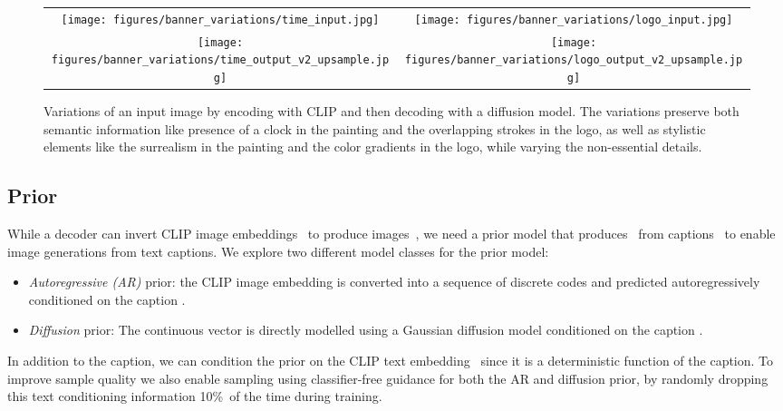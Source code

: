 \documentclass{article}
\begin{document}
\begin{figure*}[t!]
    \centering
    \setlength{\tabcolsep}{2.0pt}
    \begin{tabular}{cc}
        \texttt{[image: figures/banner\_variations/time\_input.jpg]} & 
        \texttt{[image: figures/banner\_variations/logo\_input.jpg]} 
        \rule{0pt}{0.0pt} \\
        \texttt{[image: figures/banner\_variations/time\_output\_v2\_upsample.jpg]} &
        \texttt{[image: figures/banner\_variations/logo\_output\_v2\_upsample.jpg]} 
        \rule{0pt}{0.5pt}
    \end{tabular}

    \caption{Variations of an input image by encoding with CLIP and then decoding with a diffusion model. The variations preserve both semantic information like presence of a clock in the painting and the overlapping strokes in the logo, as well as stylistic elements like the surrealism in the painting and the color gradients in the logo, while varying the non-essential details.}
    \label{fig:variations_examples}
    \vskip -0.1in 
\end{figure*}

\subsection{Prior}
While a decoder can invert CLIP image embeddings~ to produce images~, we need a prior model that produces~ from captions~ to enable image generations from text captions. We explore two different model classes for the prior model:

\begin{itemize}
    \item \textit{Autoregressive (AR)} prior: the CLIP image embedding  is converted into a sequence of discrete codes and predicted autoregressively conditioned on the caption .
    \item \textit{Diffusion} prior: The continuous vector  is directly modelled using a Gaussian diffusion model conditioned on the caption .
\end{itemize}

In addition to the caption, we can condition the prior on the CLIP text embedding~ since it is a deterministic function of the caption. To improve sample quality we also enable sampling using classifier-free guidance for both the AR and diffusion prior, by randomly dropping this text conditioning information 10\%~of the time during training.
\end{document}
